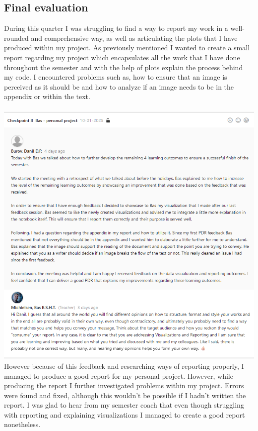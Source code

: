 \documentclass{article}
\begin{document}
	\subsection{Final evaluation} %
	During this quarter I was struggling to find a way to report my work in a well-rounded and comprehensive way, as well as articulating the plots that I have produced within my project. As previously mentioned I wanted to create a small report regarding my project which encapsulates all the work that I have done throughout the semester and with the help of plots explain the process behind my code. I encountered problems such as, how to ensure that an image is perceived as it should be and how to analyze if an image needs to be in the appendix or within the text.\\\\
	\includegraphics[width=\textwidth]{images/Feedback_Bas_4.png}\\
	However because of this feedback and researching ways of reporting properly, I managed to produce a good report for my personal project. However, while producing the report I further investigated problems within my project. Errors were found and fixed, although this wouldn't be possible if I hadn't written the report. I was glad to hear from my semester coach that even though struggling with reporting and explaining visualizations I managed to create a good report nonetheless.\\\\
\end{document}
